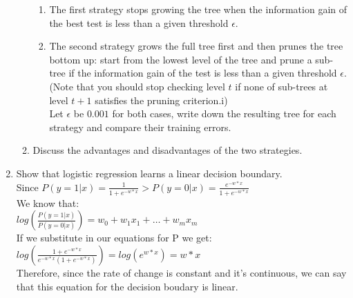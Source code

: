 \documentclass[12pt,letterpaper]{article}
\begin{document}
\begin{enumerate}
\begin{enumerate}
		\begin{enumerate} 
			\item The first strategy stops growing the tree when the information gain of the best test is less than a given threshold $\epsilon$. \\
			\item The second strategy grows the full tree first and then prunes the tree bottom up: start from the lowest level of the tree and prune a sub-tree if the information gain of the test is less than a given threshold $\epsilon$. (Note that you should stop checking level $t$ if none of sub-trees at level $t+1$ satisfies the pruning criterion.i) \\
		Let $\epsilon$ be $0.001$ for both cases, write down the resulting tree for each strategy and compare their training errors. \\
		\end{enumerate} 	
		\item Discuss the advantages and disadvantages of the two strategies. \\
	\end{enumerate} 
	\item Show that logistic regression learns a linear decision boundary. \\
	Since $P(y = 1 | x) = \frac{1}{1 + e^{-w*x}} > P(y = 0 | x) = \frac{e^{-w*x}}{1 + e^{-w*x}}$ \\
	We know that: \\
	$log(\frac{P(y = 1 | x)}{P(y = 0 | x)}) = w_{0} + w_{1}x_{1} + \ldots + w_{m}x_{m}$ \\
	If we substitute in our equations for P we get: \\
	$log(\frac{1 + e^{-w*x}}{e^{-w*x}(1 + e^{-w*x})}) = log(e^{w*x}) = w*x$ \\
	Therefore, since the rate of change is constant and it's continuous, we can say that this equation for the decision boudary is linear. \\
\end{enumerate}
\end{document}
